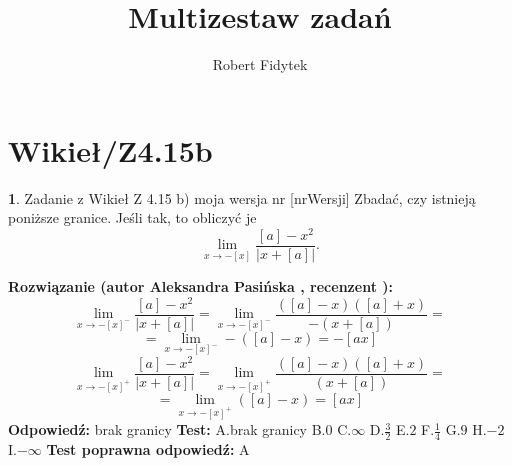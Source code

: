 \documentclass[12pt, a4paper]{article}
\title{Multizestaw zadań}
\author{Robert Fidytek}
\date{}
\theoremstyle{definition} %
\newtheorem{zad}{}
\newcommand{\kategoria}[1]{\section{#1}} %
\newcommand{\zadStart}[1]{\begin{zad}#1\newline} %
\newcommand{\zadStop}{\end{zad}}   %
\newcommand{\rozwStart}[2]{\noindent \textbf{Rozwiązanie (autor #1 , recenzent #2): }\newline} %
\newcommand{\rozwStop}{\newline}                                            %
\newcommand{\odpStart}{\noindent \textbf{Odpowiedź:}\newline}    %
\newcommand{\odpStop}{\newline}                                             %
\newcommand{\testStart}{\noindent \textbf{Test:}\newline} %
\newcommand{\testStop}{\newline} %
\newcommand{\kluczStart}{\noindent \textbf{Test poprawna odpowiedź:}\newline} %
\newcommand{\kluczStop}{\newline} %
\begin{document}
\maketitle


\kategoria{Wikieł/Z4.15b}
\zadStart{Zadanie z Wikieł Z 4.15 b) moja wersja nr [nrWersji]}
Zbadać, czy istnieją poniższe granice. Jeśli tak, to obliczyć je $$\lim_{x\rightarrow -[x]}\frac{[a]-x^2}{|x+[a]|}.$$
\zadStop
\rozwStart{Aleksandra Pasińska}{}
$$\lim_{x\rightarrow -[x]^-}\frac{[a]-x^2}{|x+[a]|}=\lim_{x\rightarrow -[x]^-}\frac{([a]-x)([a]+x)}{-(x+[a])}=$$
$$=\lim_{x\rightarrow -[x]^-}-([a]-x)=-[ax]$$ 
$$\lim_{x\rightarrow -[x]^+}\frac{[a]-x^2}{|x+[a]|}=\lim_{x\rightarrow -[x]^+}\frac{([a]-x)([a]+x)}{(x+[a])}=$$
$$=\lim_{x\rightarrow -[x]^+}([a]-x)=[ax]$$ 
\rozwStop
\odpStart
brak granicy
\odpStop
\testStart
A.brak granicy
B.$0$
C.$\infty$
D.$\frac{3}{2}$
E.$2$
F.$\frac{1}{4}$
G.$9$
H.$-2$
I.$-\infty$
\testStop
\kluczStart
A
\kluczStop
\end{document}
